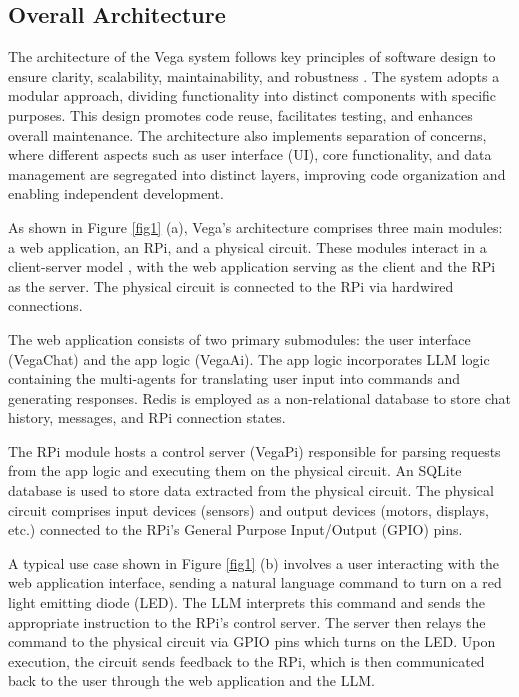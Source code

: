 \documentclass{ieeeaccess}
\begin{document}
\subsection{Overall Architecture}
The architecture of the Vega system follows key principles of software design to ensure clarity, scalability, maintainability, and robustness \cite{taylor2010software}. The system adopts a modular approach, dividing functionality into distinct components with specific purposes. This design promotes code reuse, facilitates testing, and enhances overall maintenance. The architecture also implements separation of concerns, where different aspects such as user interface (UI), core functionality, and data management are segregated into distinct layers, improving code organization and enabling independent development.

As shown in Figure \ref{fig1} (a), Vega's architecture comprises three main modules: a web application, an RPi, and a physical circuit. These modules interact in a client-server model \cite{tanenbaum2002distributed}, with the web application serving as the client and the RPi as the server. The physical circuit is connected to the RPi via hardwired connections.

The web application consists of two primary submodules: the user interface (VegaChat) and the app logic (VegaAi). The app logic incorporates LLM logic containing the multi-agents for translating user input into commands and generating responses. Redis \cite{6106531} is employed as a non-relational database to store chat history, messages, and RPi connection states.

The RPi module hosts a control server (VegaPi) responsible for parsing requests from the app logic and executing them on the physical circuit. An SQLite database \cite{sqlite} is used to store data extracted from the physical circuit. The physical circuit comprises input devices (sensors) and output devices (motors, displays, etc.) connected to the RPi's General Purpose Input/Output (GPIO) pins.

A typical use case shown in Figure  \ref{fig1} (b) involves a user interacting with the web application interface, sending a natural language command to turn on a red light emitting diode (LED). The LLM interprets this command and sends the appropriate instruction to the RPi's control server. The server then relays the command to the physical circuit via GPIO pins which turns on the LED. Upon execution, the circuit sends feedback to the RPi, which is then communicated back to the user through the web application and the LLM.
\end{document}
